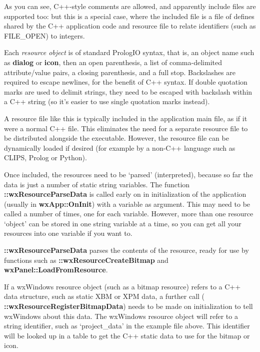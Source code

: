 As you can see, C++-style comments are allowed, and apparently include files
are supported too: but this is a special case, where the included file
is a file of defines shared by the C++ application code and resource file
to relate identifiers (such as FILE\_OPEN) to integers.

Each {\it resource object} is of standard PrologIO syntax, that is,
an object name such as {\bf dialog} or {\bf icon}, then an open
parenthesis, a list of comma-delimited attribute/value pairs, a closing
parenthesis, and a full stop. Backslashes are required to escape newlines,
for the benefit of C++ syntax. If double quotation marks are used to
delimit strings, they need to be escaped with backslash within a C++ string
(so it's easier to use single quotation marks instead).


A resource file like this is typically included in the application main file,
as if it were a normal C++ file. This eliminates the need for a separate
resource file to be distributed alongside the executable. However, the
resource file can be dynamically loaded if desired (for example by a non-C++
language such as CLIPS, Prolog or Python).

Once included, the resources need to be `parsed' (interpreted), because
so far the data is just a number of static string variables. The function\rtfsp
{\bf ::wxResourceParseData} is called early on in initialization of the application
(usually in {\bf wxApp::OnInit}) with a variable as argument. This may need to be
called a number of times, one for each variable. However, more than one
resource `object' can be stored in one string variable at a time, so you can
get all your resources into one variable if you want to.

{\bf ::wxResourceParseData} parses the contents of the resource, ready for use
by functions such as {\bf ::wxResourceCreateBitmap} and {\bf wxPanel::LoadFromResource}.

If a wxWindows resource object (such as a bitmap resource) refers to a
C++ data structure, such as static XBM or XPM data, a further call ({\bf
::wxResourceRegisterBitmapData}) needs to be made on initialization to tell
wxWindows about this data. The wxWindows resource object will refer to a
string identifier, such as `project\_data' in the example file above.
This identifier will be looked up in a table to get the C++ static data
to use for the bitmap or icon.

